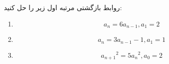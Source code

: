 \EXERCISE
روابط بازگشتی مرتبه اول زیر را حل کنید:
\begin{enumerate}
\item
$$a_n = 6a_{n-1}, a_1 = 2$$
\item
$$a_n = 3a_{n-1} - 1, a_1 = 1$$
\item
$${a_{n+1}}^2 = 5{a_n}^2, a_0 = 2$$
\end{enumerate}